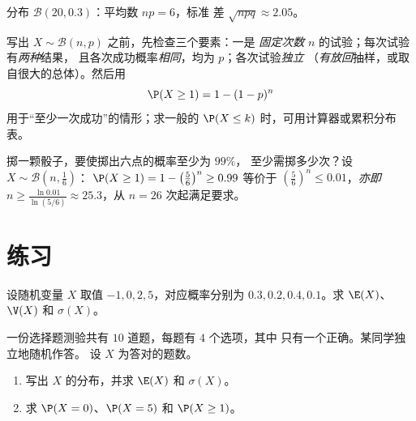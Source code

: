 \begin{omfigure}

{\small 分布 $\mathcal B(20, 0.3)$：平均数 $np = 6$，标准
差 $\sqrt{npq} \approx 2.05$。}
\end{omfigure}

\begin{method}[识别二项分布情形]\label{met:g12:randvar:recognize}
写出 $X \sim \mathcal B(n,p)$ 之前，先检查三个要素：一是
\emph{固定次数} $n$ 的试验；每次试验有\emph{两种}结果，
且各次成功概率\emph{相同}，均为 $p$；各次试验\emph{独立}
（\emph{有放回}抽样，或取自很大的总体）。然后用
\[
\P(X \geq 1) = 1 - (1-p)^n
\]
用于“至少一次成功”的情形；求一般的
$\P(X \leq k)$ 时，可用计算器或累积分布表。
\end{method}

\begin{example}\label{ex:g12:randvar:atleastone}
掷一颗骰子，要使掷出六点的概率至少为 $99\%$，
至少需掷多少次？设 $X \sim \mathcal B\left(n, \frac16\right)$：
$\P(X \geq 1) = 1 - \left(\frac56\right)^n \geq 0.99$ 等价于
$\left(\frac56\right)^n \leq 0.01$，\emph{亦即}
$n \geq \frac{\ln 0.01}{\ln(5/6)} \approx 25.3$，从 $n = 26$ 次起满足要求。
\end{example}

\section{练习}

\begin{exercise}[$\star$]\label{exo:g12:randvar:1}
设随机变量 $X$ 取值 $-1, 0, 2, 5$，对应概率分别为
$0.3, 0.2, 0.4, 0.1$。求 $\E(X)$、$\V(X)$ 和 $\sigma(X)$。
\end{exercise}

\begin{exercise}[$\star$]\label{exo:g12:randvar:2}
一份选择题测验共有 $10$ 道题，每题有 $4$ 个选项，其中
只有一个正确。某同学独立地随机作答。
设 $X$ 为答对的题数。
\begin{enumerate}
  \item 写出 $X$ 的分布，并求 $\E(X)$ 和 $\sigma(X)$。
  \item 求 $\P(X = 0)$、$\P(X = 5)$ 和 $\P(X \geq 1)$。
\end{enumerate}
\end{exercise}

